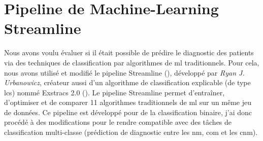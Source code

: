 \section{Pipeline de Machine-Learning Streamline}
Nous avons voulu évaluer si il était possible de prédire le diagnostic des patients via des techniques de classification par algorithmes de \gls{ml} traditionnels. Pour cela, nous avons utilisé et modifié le pipeline Streamline (\cite{urbanowicz_streamline_2023}), développé par \textit{Ryan J. Urbanowicz}, créateur aussi d'un algorithme de classification explicable (de type \gls{lcs})  nommé Exstracs 2.0 (\cite{urbanowicz_exstracs_2015}).
Le pipeline Streamline permet d'entraîner, d'optimiser et de comparer 11 algorithmes traditionnels de \gls{ml} sur un même jeu de données. Ce pipeline est développé pour de la classification binaire, j'ai donc procédé à des modifications pour le rendre compatible avec des tâches de classification multi-classe (prédiction de diagnostic entre les \gls{nm}, \gls{com} et les \gls{cnm}).
